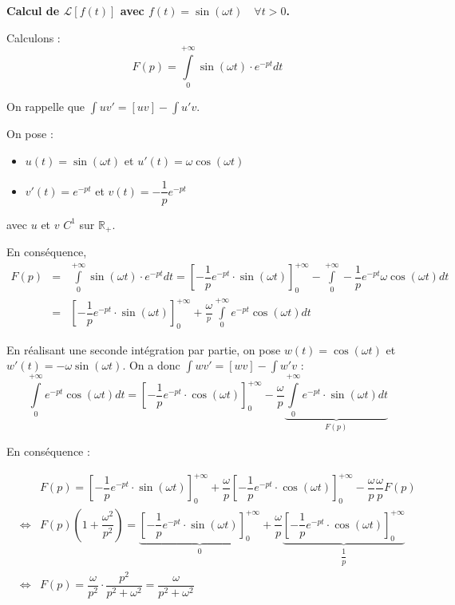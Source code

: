 \documentclass[10pt,fleqn]{article} %
\begin{document}
\textbf{Calcul de $\mathcal{L}\left[f(t) \right]$ avec $f(t)= \sin \left(\omega t \right)\quad \forall t> 0$.}

Calculons :
$$
F(p)= \int\limits_0^{+ \infty} \sin \left(\omega t \right) \cdot e^{-pt}dt
$$

On rappelle que $\int uv'  = [uv]-\int u'v$.

On pose : 
\begin{itemize}
\item $u(t)=\sin \left(\omega t\right)$ et $u'(t)=\omega \cos \left(\omega t\right)$
\item $v'(t)=e^{-pt}$ et $v(t)=-\dfrac{1}{p}e^{-pt}$
\end{itemize}
avec $u$ et $v$ $C^1$ sur $\mathbb{R_+}$.

En conséquence, 
\begin{eqnarray*}
F(p)
&=& \int\limits_0^{+ \infty} \sin \left(\omega t \right) \cdot e^{-pt}dt
= \left[-\dfrac{1}{p}e^{-pt} \cdot \sin \left(\omega t\right) \right]_0^{+ \infty}
- \int\limits_0^{+ \infty} -\dfrac{1}{p}e^{-pt} \omega \cos \left(\omega t\right) dt \\
&=& \left[-\dfrac{1}{p}e^{-pt} \cdot \sin \left(\omega t\right) \right]_0^{+ \infty}
+\dfrac{\omega}{^p}\int\limits_0^{+ \infty} e^{-pt} \cos \left(\omega t\right) dt
\end{eqnarray*}

En réalisant une seconde intégration par partie, on pose $w(t)=\cos \left(\omega t\right)$ et $w'(t)=-\omega \sin \left(\omega t\right)$. On a donc $\int wv'  = [wv]-\int w'v$ :
$$
\int\limits_0^{+ \infty} e^{-pt} \cos \left(\omega t\right) dt
= \left[-\dfrac{1}{p}e^{-pt} \cdot \cos \left(\omega t\right) \right]_0^{+ \infty}
- \dfrac{\omega}{p} \underbrace{\int\limits_0^{+ \infty} e^{-pt} \cdot  \sin \left(\omega t\right) dt}_{F(p)}
$$

En conséquence :

\begin{eqnarray*}
&&F(p)=\left[-\dfrac{1}{p}e^{-pt} \cdot \sin \left(\omega t\right) \right]_0^{+ \infty}
+\dfrac{\omega}{p}\left[-\dfrac{1}{p}e^{-pt} \cdot \cos \left(\omega t\right) \right]_0^{+ \infty}
- \dfrac{\omega}{p}\dfrac{\omega}{p} F(p) \\
&\Longleftrightarrow &
F(p)\left(1+\dfrac{\omega^2}{p^2}\right) =\underbrace{\left[-\dfrac{1}{p}e^{-pt} \cdot \sin \left(\omega t\right) \right]_0^{+ \infty}}_{0}
+\dfrac{\omega}{p}
\underbrace{\left[-\dfrac{1}{p}e^{-pt} \cdot \cos \left(\omega t\right) \right]_0^{+ \infty}}_{\dfrac{1}{p}}\\
&\Longleftrightarrow &
F(p)=\dfrac{\omega}{p^2}\cdot\dfrac{p^2}{p^2+\omega^2} = \dfrac{\omega}{p^2+\omega^2}
\end{eqnarray*}
\end{document}
